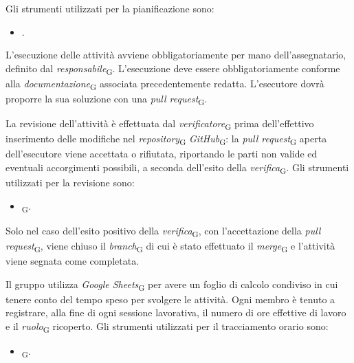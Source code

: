 Gli strumenti utilizzati per la pianificazione sono:
    \begin{itemize}
        \item {}.
    \end{itemize}

L'esecuzione delle attività avviene obbligatoriamente per mano dell'assegnatario, definito dal \textit{responsabile}\textsubscript{G}. L'esecuzione deve essere obbligatoriamente conforme alla \textit{documentazione}\textsubscript{G} associata precedentemente redatta. L'esecutore dovrà proporre la sua soluzione con una \textit{pull request}\textsubscript{G}.

La revisione dell'attività è effettuata dal \textit{verificatore}\textsubscript{G} prima dell'effettivo inserimento delle modifiche nel \textit{repository}\textsubscript{G} \textit{GitHub}\textsubscript{G}: la \textit{pull request}\textsubscript{G} aperta dell'esecutore viene accettata o rifiutata, riportando le parti non valide ed eventuali accorgimenti possibili, a seconda dell'esito della \textit{verifica}\textsubscript{G}.
Gli strumenti utilizzati per la revisione sono:
    \begin{itemize}
        \item \textit{}\textsubscript{G}.
    \end{itemize}

Solo nel caso dell'esito positivo della \textit{verifica}\textsubscript{G}, con l'accettazione della \textit{pull request}\textsubscript{G}, viene chiuso il \textit{branch}\textsubscript{G} di cui è stato effettuato il \textit{merge}\textsubscript{G} e l'attività viene segnata come completata. 

Il gruppo utilizza \textit{Google Sheets}\textsubscript{G} per avere un foglio di calcolo condiviso in cui tenere conto del tempo speso per svolgere le attività. Ogni membro è tenuto a registrare, alla fine di ogni sessione lavorativa, il numero di ore effettive di lavoro e il \textit{ruolo}\textsubscript{G} ricoperto.
Gli strumenti utilizzati per il tracciamento orario sono:
    \begin{itemize}
        \item \textit{}\textsubscript{G}.
    \end{itemize}


